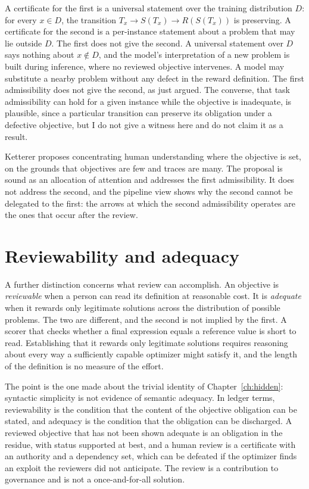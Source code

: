 A certificate for the first is a universal statement over the training distribution $D$: for every $x \in D$, the transition $T_x \to S(T_x) \to R(S(T_x))$ is preserving. A certificate for the second is a per-instance statement about a problem that may lie outside $D$. The first does not give the second. A universal statement over $D$ says nothing about $x \notin D$, and the model's interpretation of a new problem is built during inference, where no reviewed objective intervenes. A model may substitute a nearby problem without any defect in the reward definition. The first admissibility does not give the second, as just argued. The converse, that task admissibility can hold for a given instance while the objective is inadequate, is plausible, since a particular transition can preserve its obligation under a defective objective, but I do not give a witness here and do not claim it as a result.

Ketterer proposes concentrating human understanding where the objective is set, on the grounds that objectives are few and traces are many. The proposal is sound as an allocation of attention and addresses the first admissibility. It does not address the second, and the pipeline view shows why the second cannot be delegated to the first: the arrows at which the second admissibility operates are the ones that occur after the review.

\section{Reviewability and adequacy}

A further distinction concerns what review can accomplish. An objective is \emph{reviewable} when a person can read its definition at reasonable cost. It is \emph{adequate} when it rewards only legitimate solutions across the distribution of possible problems. The two are different, and the second is not implied by the first. A scorer that checks whether a final expression equals a reference value is short to read. Establishing that it rewards only legitimate solutions requires reasoning about every way a sufficiently capable optimizer might satisfy it, and the length of the definition is no measure of the effort.

The point is the one made about the trivial identity of Chapter~\ref{ch:hidden}: syntactic simplicity is not evidence of semantic adequacy. In ledger terms, reviewability is the condition that the content of the objective obligation can be stated, and adequacy is the condition that the obligation can be discharged. A reviewed objective that has not been shown adequate is an obligation in the residue, with status \textsf{supported} at best, and a human review is a certificate with an authority and a dependency set, which can be defeated if the optimizer finds an exploit the reviewers did not anticipate. The review is a contribution to governance and is not a once-and-for-all solution.

